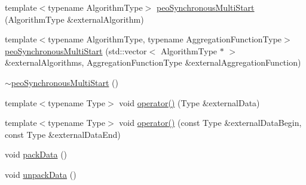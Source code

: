 \begin{CompactItemize}
\item 
\hypertarget{classpeoSynchronousMultiStart_e9a336c61dd6216d7d15253ff9c9d2a3}{
template$<$typename Algorithm\-Type$>$ \hyperlink{classpeoSynchronousMultiStart_e9a336c61dd6216d7d15253ff9c9d2a3}{peo\-Synchronous\-Multi\-Start} (Algorithm\-Type \&external\-Algorithm)}
\label{classpeoSynchronousMultiStart_e9a336c61dd6216d7d15253ff9c9d2a3}

\item 
\hypertarget{classpeoSynchronousMultiStart_689374232ff67f266ddaa5d309ea54ac}{
template$<$typename Algorithm\-Type, typename Aggregation\-Function\-Type$>$ \hyperlink{classpeoSynchronousMultiStart_689374232ff67f266ddaa5d309ea54ac}{peo\-Synchronous\-Multi\-Start} (std::vector$<$ Algorithm\-Type $\ast$ $>$ \&external\-Algorithms, Aggregation\-Function\-Type \&external\-Aggregation\-Function)}
\label{classpeoSynchronousMultiStart_689374232ff67f266ddaa5d309ea54ac}

\item 
\hypertarget{classpeoSynchronousMultiStart_f9ec55d67f5f45f5a737064fae569277}{
\hyperlink{classpeoSynchronousMultiStart_f9ec55d67f5f45f5a737064fae569277}{$\sim$peo\-Synchronous\-Multi\-Start} ()}
\label{classpeoSynchronousMultiStart_f9ec55d67f5f45f5a737064fae569277}

\item 
\hypertarget{classpeoSynchronousMultiStart_1fd09337a6edcf173edff1fdda2387c7}{
template$<$typename Type$>$ void \hyperlink{classpeoSynchronousMultiStart_1fd09337a6edcf173edff1fdda2387c7}{operator()} (Type \&external\-Data)}
\label{classpeoSynchronousMultiStart_1fd09337a6edcf173edff1fdda2387c7}

\item 
\hypertarget{classpeoSynchronousMultiStart_45372c26ac5b979d29458815debceff8}{
template$<$typename Type$>$ void \hyperlink{classpeoSynchronousMultiStart_45372c26ac5b979d29458815debceff8}{operator()} (const Type \&external\-Data\-Begin, const Type \&external\-Data\-End)}
\label{classpeoSynchronousMultiStart_45372c26ac5b979d29458815debceff8}

\item 
\hypertarget{classpeoSynchronousMultiStart_c73358b4f04f258c55f631660a7992fb}{
void \hyperlink{classpeoSynchronousMultiStart_c73358b4f04f258c55f631660a7992fb}{pack\-Data} ()}
\label{classpeoSynchronousMultiStart_c73358b4f04f258c55f631660a7992fb}

\item 
\hypertarget{classpeoSynchronousMultiStart_9881b3f05c9f90bcb3c3ec0af8109ccc}{
void \hyperlink{classpeoSynchronousMultiStart_9881b3f05c9f90bcb3c3ec0af8109ccc}{unpack\-Data} ()}
\label{classpeoSynchronousMultiStart_9881b3f05c9f90bcb3c3ec0af8109ccc}


\end{CompactItemize}
